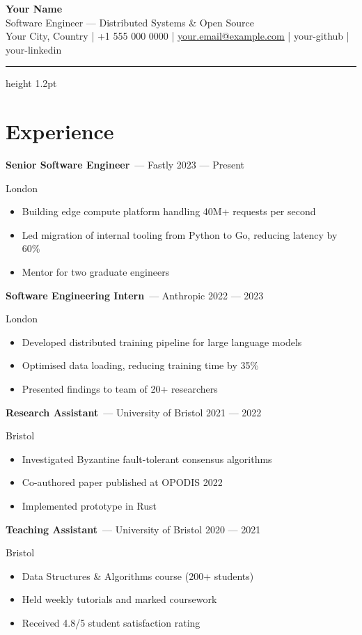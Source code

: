 \documentclass[11pt,a4paper]{article}
\newcommand{\role}[2]{%
  \noindent\textbf{#1}\ \textcolor{muted}{— #2}%
}
\newcommand{\dateright}[1]{%
  \hfill\textcolor{light}{\small #1}%
}
\newcommand{\location}[1]{%
  \par{\small\color{light} #1\par}%
}
\newcommand{\bullets}[1]{%
  \vspace{2pt}%
  \begin{itemize}[leftmargin=14pt,nosep,itemsep=2pt,topsep=2pt]%
    #1%
  \end{itemize}%
  \vspace{6pt}%
}
\begin{document}
\begin{center}
  {\LARGE\bfseries Your Name}\\[3pt]
  {\large\color{accent} Software Engineer — Distributed Systems \& Open Source}\\[6pt]
  {\small\color{muted}
    Your City, Country \quad|\quad
    +1 555 000 0000 \quad|\quad
    \href{mailto:your.email@example.com}{your.email@example.com} \quad|\quad
    your-github \quad|\quad
    your-linkedin
  }
\end{center}

\vspace{4pt}
\hrule height 1.2pt
\vspace{8pt}

\section*{Experience}

\role{Senior Software Engineer}{Fastly}\dateright{2023 — Present}
\location{London}
\bullets{
  \item Building edge compute platform handling 40M+ requests per second
  \item Led migration of internal tooling from Python to Go, reducing latency by 60\%
  \item Mentor for two graduate engineers
}

\role{Software Engineering Intern}{Anthropic}\dateright{2022 — 2023}
\location{London}
\bullets{
  \item Developed distributed training pipeline for large language models
  \item Optimised data loading, reducing training time by 35\%
  \item Presented findings to team of 20+ researchers
}

\role{Research Assistant}{University of Bristol}\dateright{2021 — 2022}
\location{Bristol}
\bullets{
  \item Investigated Byzantine fault-tolerant consensus algorithms
  \item Co-authored paper published at OPODIS 2022
  \item Implemented prototype in Rust
}

\role{Teaching Assistant}{University of Bristol}\dateright{2020 — 2021}
\location{Bristol}
\bullets{
  \item Data Structures \& Algorithms course (200+ students)
  \item Held weekly tutorials and marked coursework
  \item Received 4.8/5 student satisfaction rating
}
\end{document}
